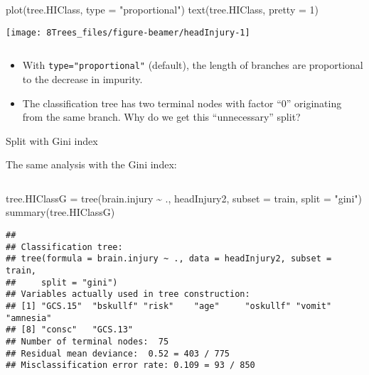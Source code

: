 \documentclass[
  10pt,
  ignorenonframetext,
]{beamer}
\newenvironment{Shaded}{\begin{snugshade}}{\end{snugshade}}
\newcommand{\AttributeTok}[1]{\textcolor[rgb]{0.77,0.63,0.00}{#1}}
\newcommand{\DecValTok}[1]{\textcolor[rgb]{0.00,0.00,0.81}{#1}}
\newcommand{\FunctionTok}[1]{\textcolor[rgb]{0.00,0.00,0.00}{#1}}
\newcommand{\NormalTok}[1]{#1}
\newcommand{\OtherTok}[1]{\textcolor[rgb]{0.56,0.35,0.01}{#1}}
\newcommand{\SpecialCharTok}[1]{\textcolor[rgb]{0.00,0.00,0.00}{#1}}
\newcommand{\StringTok}[1]{\textcolor[rgb]{0.31,0.60,0.02}{#1}}
\begin{document}
\begin{frame}[fragile]
\scriptsize

\begin{Shaded}
\begin{Highlighting}[]
\FunctionTok{plot}\NormalTok{(tree.HIClass, }\AttributeTok{type =} \StringTok{"proportional"}\NormalTok{)}
\FunctionTok{text}\NormalTok{(tree.HIClass, }\AttributeTok{pretty =} \DecValTok{1}\NormalTok{)}
\end{Highlighting}
\end{Shaded}

\begin{center}\texttt{[image: 8Trees\_files/figure-beamer/headInjury-1]} \end{center}

\(~\)

\normalsize

\begin{itemize}
\item
  With \texttt{type="proportional"} (default), the length of branches
  are proportional to the decrease in impurity.
\item
  The classification tree has two terminal nodes with factor ``0''
  originating from the same branch. Why do we get this ``unnecessary''
  split?
\end{itemize}
\end{frame}

\begin{frame}[fragile]
\begin{block}{Split with Gini index}
\protect\hypertarget{split-with-gini-index}{}
\(~\)

The same analysis with the Gini index:

\(~\)

\scriptsize

\begin{Shaded}
\begin{Highlighting}[]
\NormalTok{tree.HIClassG }\OtherTok{=} \FunctionTok{tree}\NormalTok{(brain.injury }\SpecialCharTok{\textasciitilde{}}\NormalTok{ ., headInjury2, }\AttributeTok{subset =}\NormalTok{ train, }\AttributeTok{split =} \StringTok{"gini"}\NormalTok{)}
\FunctionTok{summary}\NormalTok{(tree.HIClassG)}
\end{Highlighting}
\end{Shaded}

\begin{verbatim}
## 
## Classification tree:
## tree(formula = brain.injury ~ ., data = headInjury2, subset = train, 
##     split = "gini")
## Variables actually used in tree construction:
## [1] "GCS.15"  "bskullf" "risk"    "age"     "oskullf" "vomit"   "amnesia"
## [8] "consc"   "GCS.13" 
## Number of terminal nodes:  75 
## Residual mean deviance:  0.52 = 403 / 775 
## Misclassification error rate: 0.109 = 93 / 850
\end{verbatim}
\end{block}
\end{frame}
\end{document}
